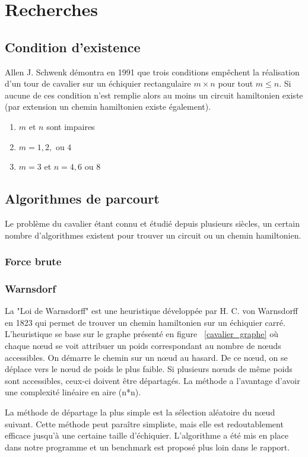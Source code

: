 \section{Recherches}
\subsection{Condition d'existence}
Allen J. Schwenk démontra en 1991 que trois conditions empêchent la réalisation d'un tour de cavalier sur un échiquier rectangulaire $m \times n$  pour tout $m \leq n$. Si aucune de ces condition n'est remplie alors au moins un circuit hamiltonien existe (par extension un chemin hamiltonien existe également).
\begin{enumerate}
\item $m$ et $n$ sont impaires
\item $m = 1,2,$ ou $4$
\item $m = 3$ et $n = 4,6$ ou $8$
\end{enumerate}

\subsection{Algorithmes de parcourt}
Le problème du cavalier étant connu et étudié depuis plusieurs siècles, un certain nombre d'algorithmes existent pour trouver un circuit ou un chemin hamiltonien.

\subsubsection{Force brute}
\subsubsection{Warnsdorf}
La "Loi de Warnsdorff" est une heuristique développée par H. C. von Warnsdorff en 1823 qui permet de trouver un chemin hamiltonien sur un échiquier carré. L'heuristique se base sur le graphe présenté en figure ~\ref{cavalier_graphe} où chaque nœud se voit attribuer un poids correspondant au nombre de nœuds accessibles. On démarre le chemin sur un nœud au hasard. De ce nœud, on se déplace vers le nœud de poids le plus faible. Si plusieurs nœuds de même poids sont accessibles, ceux-ci doivent être départagés. La méthode a l'avantage d'avoir une complexité linéaire en aire (n*n). 

La méthode de départage la plus simple est la sélection aléatoire du nœud suivant. Cette méthode peut paraître simpliste, mais elle est redoutablement efficace jusqu'à une certaine taille d'échiquier. L'algorithme a été mis en place dans notre programme et un benchmark est proposé plus loin dans le rapport.

